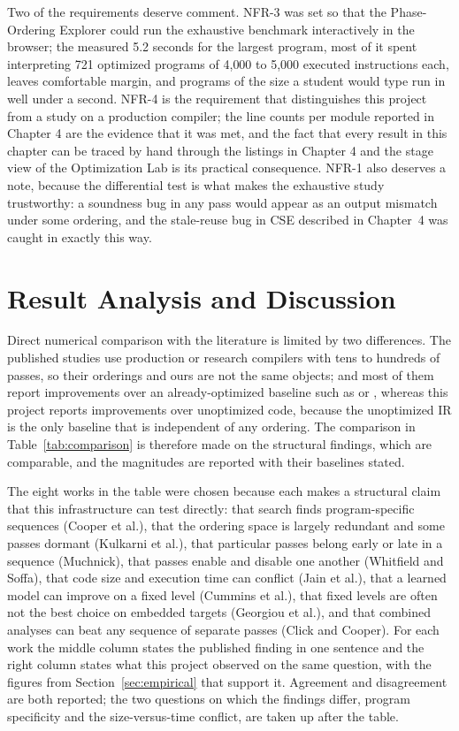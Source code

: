 Two of the requirements deserve comment. NFR-3 was set so that the Phase-Ordering Explorer could run the exhaustive benchmark interactively in the browser; the measured 5.2 seconds for the largest program, most of it spent interpreting 721 optimized programs of 4{,}000 to 5{,}000 executed instructions each, leaves comfortable margin, and programs of the size a student would type run in well under a second. NFR-4 is the requirement that distinguishes this project from a study on a production compiler; the line counts per module reported in Chapter 4 are the evidence that it was met, and the fact that every result in this chapter can be traced by hand through the listings in Chapter 4 and the stage view of the Optimization Lab is its practical consequence. NFR-1 also deserves a note, because the differential test is what makes the exhaustive study trustworthy: a soundness bug in any pass would appear as an output mismatch under some ordering, and the stale-reuse bug in CSE described in Chapter~4 was caught in exactly this way.

\section{Result Analysis and Discussion}
\label{sec:analysis}

Direct numerical comparison with the literature is limited by two differences. The published studies use production or research compilers with tens to hundreds of passes, so their orderings and ours are not the same objects; and most of them report improvements over an already-optimized baseline such as  or , whereas this project reports improvements over unoptimized code, because the unoptimized IR is the only baseline that is independent of any ordering. The comparison in Table~\ref{tab:comparison} is therefore made on the structural findings, which are comparable, and the magnitudes are reported with their baselines stated.

The eight works in the table were chosen because each makes a structural claim that this infrastructure can test directly: that search finds program-specific sequences (Cooper et al.), that the ordering space is largely redundant and some passes dormant (Kulkarni et al.), that particular passes belong early or late in a sequence (Muchnick), that passes enable and disable one another (Whitfield and Soffa), that code size and execution time can conflict (Jain et al.), that a learned model can improve on a fixed level (Cummins et al.), that fixed levels are often not the best choice on embedded targets (Georgiou et al.), and that combined analyses can beat any sequence of separate passes (Click and Cooper). For each work the middle column states the published finding in one sentence and the right column states what this project observed on the same question, with the figures from Section~\ref{sec:empirical} that support it. Agreement and disagreement are both reported; the two questions on which the findings differ, program specificity and the size-versus-time conflict, are taken up after the table.

